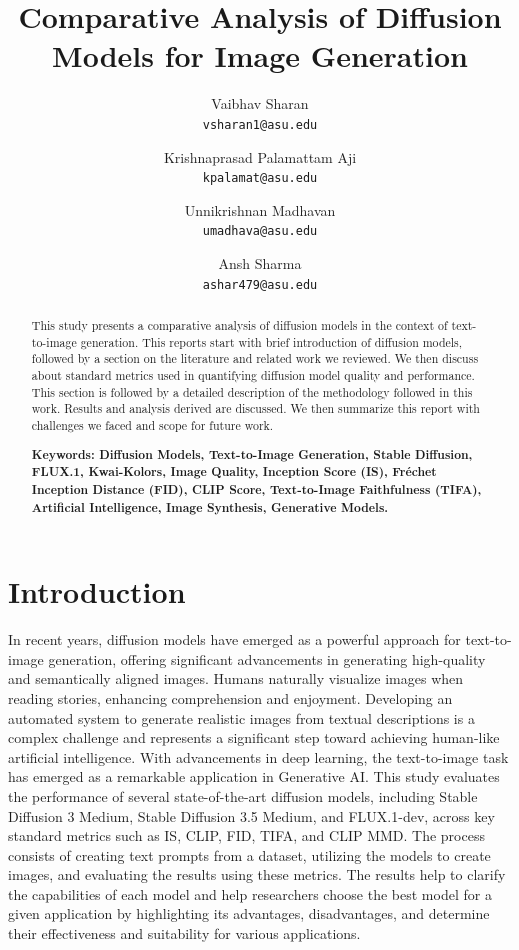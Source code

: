 \documentclass{article}
\title{Comparative Analysis of Diffusion Models for Image Generation
}
\author{
  Vaibhav Sharan\\
  \texttt{vsharan1@asu.edu} \\ 
  \and
  Krishnaprasad Palamattam Aji\\
  \texttt{kpalamat@asu.edu}\\
  \and
  Unnikrishnan Madhavan\\
  \texttt{umadhava@asu.edu}\\
  \and
  Ansh Sharma\\
  \texttt{ashar479@asu.edu}
}
\begin{document}
\maketitle

\begin{abstract}
    This study presents a comparative analysis of diffusion models in the context of text-to-image generation. This reports start with brief introduction of diffusion models, followed by a section on the literature and related work we reviewed. We then discuss about standard metrics used in quantifying diffusion model quality and performance. This section is followed by a detailed description of   the methodology followed in this work. Results and analysis derived are discussed. We then summarize this report with challenges we faced and scope for future work.
    
    \textbf{Keywords: Diffusion Models, Text-to-Image Generation, Stable Diffusion, FLUX.1, Kwai-Kolors, Image Quality, Inception Score (IS), Fréchet Inception Distance (FID), CLIP Score, Text-to-Image Faithfulness (TIFA), Artificial Intelligence, Image Synthesis, Generative Models.}
\end{abstract}

\section{Introduction}
In recent years, diffusion models have emerged as a powerful approach for text-to-image generation, offering significant advancements in generating high-quality and semantically aligned images. Humans naturally visualize images when reading stories, enhancing comprehension and enjoyment. Developing an automated system to generate realistic images from textual descriptions is a complex challenge and represents a significant step toward achieving human-like artificial intelligence. With advancements in deep learning, the text-to-image task has emerged as a remarkable application in Generative AI. This study evaluates the performance of several state-of-the-art diffusion models, including Stable Diffusion 3 Medium, Stable Diffusion 3.5 Medium, and FLUX.1-dev, across key standard metrics such as IS, CLIP, FID, TIFA, and CLIP MMD. The process consists of creating text prompts from a dataset, utilizing the models to create images, and evaluating the results using these metrics. The results help to clarify the capabilities of each model and help researchers choose the best model for a given application by highlighting its advantages, disadvantages, and determine their effectiveness and suitability for various applications.
\end{document}
